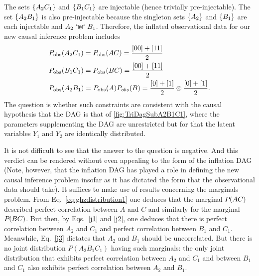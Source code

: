 The sets $\brackets{A_2 C_1}$ and $\brackets{B_1 C_1}$ are injectable (hence trivially pre-injectable). The set $\brackets{A_2 B_1}$ is also pre-injectable because the singleton sets $\brackets{A_2}$ and $\brackets{B_1}$ are each injectable and $A_2 \aindep B_1$.
Therefore, the inflated observational data for our new causal inference problem includes
\begin{align}
&\pdf[\text{obs}]{A_2 C_1}=\pdf[\text{obs}]{A C} = \frac{[00]+[11]}{2}\label{j1}\\
&\pdf[\text{obs}]{B_1 C_1}=\pdf[\text{obs}]{B C} = \frac{[00]+[11]}{2}\label{j2}\\
&\pdf[\text{obs}]{A_2 B_1}=\pdf[\text{obs}]{A}\pdf[obs]{B} = \frac{[0]+[1]}{2}\otimes\frac{[0]+[1]}{2} \label{j3}.
\end{align}
The question is whether such constraints are consistent with the causal hypothesis that the DAG is that of \cref{fig:TriDagSubA2B1C1}, where the parameters supplementing the DAG are unrestricted but for that the latent variables $Y_1$ and $Y_2$ are identically distributed. 

It is not difficult to see that the answer to the question is negative.  And this verdict can be rendered without even appealing to the form of the inflation DAG (Note, however, that the inflation DAG has played a role in defining the new causal inference problem insofar as it has dictated the form that the observational data should take).  It suffices to make use of results concerning the marginals problem.   From Eq.~\eqref{eq:ghzdistribution1} one deduces that the marginal $\pdf{A C}$ described perfect correlation between $A$ and $C$ and similarly for the marginal $\pdf{B C}$.  But then, by Eqs.~\eqref{j1} and \eqref{j2}, one deduces that there is perfect correlation between $A_2$ and $C_1$ and perfect correlation between $B_1$ and $C_1$.  Meanwhile, Eq.~\eqref{j3} dictates that $A_2$ and $B_1$ should be uncorrelated.  But there is no joint distribution $P(A_2 B_1 C_1)$ having such marginals:  the only joint distribution that exhibits perfect correlation between $A_2$ and $C_1$ and between $B_1$ and $C_1$ also exhibits perfect correlation between $A_2$ and $B_1$.  

